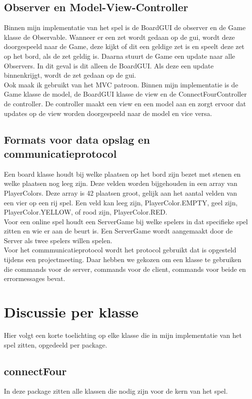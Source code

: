 \documentclass[12pt]{article}
\begin{document}
\subsection{Observer en Model-View-Controller}
Binnen mijn implementatie van het spel is de BoardGUI de observer en de Game klasse de Observable. Wanneer er een zet wordt gedaan op de gui, wordt deze doorgespeeld naar de Game, deze kijkt of dit een geldige zet is en speelt deze zet op het bord, als de zet geldig is. Daarna stuurt de Game een update naar alle Observers. In dit geval is dit alleen de BoardGUI. Als deze een update binnenkrijgt, wordt de zet gedaan op de gui.\\
Ook maak ik gebruikt van het MVC patroon. Binnen mijn implementatie is de Game klasse de model, de BoardGUI klasse de view en de ConnectFourController de controller. De controller maakt een view en een model aan en zorgt ervoor dat updates op de view worden doorgespeeld naar de model en vice versa.

\subsection{Formats voor data opslag en communicatieprotocol}
Een board klasse houdt bij welke plaatsen op het bord zijn bezet met stenen en welke plaatsen nog leeg zijn. Deze velden worden bijgehouden in een array van PlayerColors. Deze array is 42 plaatsen groot, gelijk aan het aantal velden van een vier op een rij spel. Een veld kan leeg zijn, PlayerColor.EMPTY, geel zijn, PlayerColor.YELLOW, of rood zijn, PlayerColor.RED. \\
Voor een online spel houdt een ServerGame bij welke spelers in dat specifieke spel zitten en wie er aan de beurt is. Een ServerGame wordt aangemaakt door de Server als twee spelers willen spelen.\\
Voor het commmunicatieprotocol wordt het protocol gebruikt dat is opgesteld tijdens een projectmeeting. Daar hebben we gekozen om een klasse te gebruiken die commands voor de server, commands voor de client, commands voor beide en errormessages bevat.

\newpage

\section{Discussie per klasse}
Hier volgt een korte toelichting op elke klasse die in mijn implementatie van het spel zitten, opgedeeld per package.\\
\subsection{connectFour}
In deze package zitten alle klassen die nodig zijn voor de kern van het spel.
\end{document}
